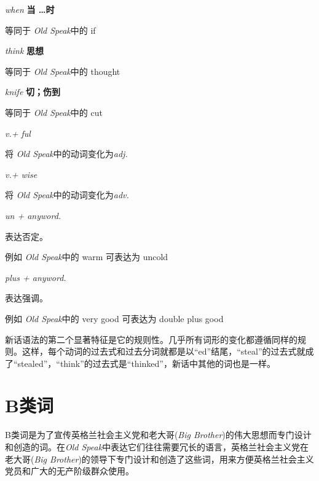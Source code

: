 \documentclass[lang=cn, color=black]{elegantbook}
\newenvironment{word}[2]{
    \noindent \textit{#1} \quad \textbf{#2} \\
    \indent
}{}
\newcommand{\os}{\textit{Old Speak}}
\newcommand{\eos}[1]{等同于 \os 中的 #1}
\newcommand{\vocab}{\textit{v.}}
\newcommand{\adj}{\textit{adj.}}
\newcommand{\adv}{\textit{adv.}}
\newcommand{\anyword}{\textit{anyword.}}
\newcommand{\ingsoc}{英格兰社会主义党}
\newcommand{\bb}{老大哥(\textit{Big Brother})}
\begin{document}
                \begin{multicols}{2}
                    \begin{word}{when}{当 \dots 时}
                        \eos{if}
                    \end{word}
    
                    \begin{word}{think}{思想}
                        \eos{thought}
                    \end{word}
    
                    \begin{word}{knife}{切；伤到}
                        \eos{cut}
                    \end{word}
    
                    \begin{word}{\vocab + ful}{}
                        将 \os 中的动词变化为\adj
                    \end{word}

                    \begin{word}{\vocab + wise}{}
                        将 \os 中的动词变化为\adv
                    \end{word}

                    \begin{word}{un + \anyword}{}
                        表达否定。
                        
                        例如 \os 中的 warm 可表达为 uncold
                    \end{word}

                    \begin{word}{plus + \anyword}{}
                        表达强调。
                        
                        例如 \os 中的 very good 可表达为 double plus good
                    \end{word}
                \end{multicols}

                新话语法的第二个显著特征是它的规则性。几乎所有词形的变化都遵循同样的规则。这样，每个动词的过去式和过去分词就都是以“ed”结尾，“steal”的过去式就成了“stealed”，“think”的过去式是“thinked”，新话中其他的词也是一样。
            
            \section{B类词}
                B类词是为了宣传\ingsoc 和\bb 的伟大思想而专门设计和创造的词。在\os 中表达它们往往需要冗长的语言，\ingsoc 在\bb 的领导下专门设计和创造了这些词，用来方便\ingsoc 员和广大的无产阶级群众使用。
\end{document}
